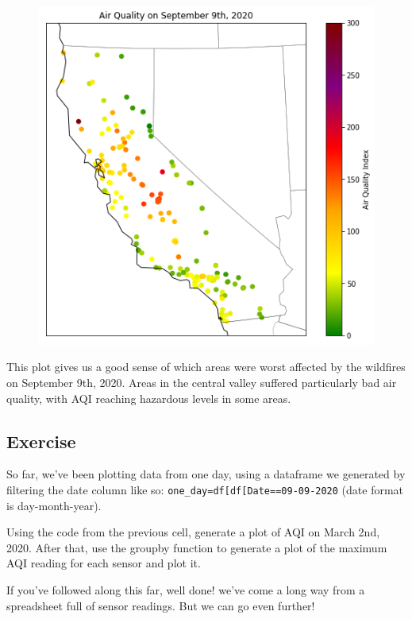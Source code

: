 \documentclass[
  letterpaper,
  DIV=11,
  numbers=noendperiod]{scrreprt}
\begin{document}
\begin{figure}[H]

{\centering \includegraphics{notebooks/W03. Spatial Data_files/figure-pdf/cell-19-output-1.png}

}

\end{figure}

This plot gives us a good sense of which areas were worst affected by
the wildfires on September 9th, 2020. Areas in the central valley
suffered particularly bad air quality, with AQI reaching hazardous
levels in some areas.

\hypertarget{exercise-7}{%
\subsection{Exercise}\label{exercise-7}}

So far, we've been plotting data from one day, using a dataframe we
generated by filtering the date column like so:
\texttt{one\_day=df{[}df{[}\textquotesingle{}Date\textquotesingle{}{]}==\textquotesingle{}09-09-2020\textquotesingle{}{]}}
(date format is day-month-year).

Using the code from the previous cell, generate a plot of AQI on March
2nd, 2020. After that, use the groupby function to generate a plot of
the maximum AQI reading for each sensor and plot it.

If you've followed along this far, well done! we've come a long way from
a spreadsheet full of sensor readings. But we can go even further!
\end{document}
